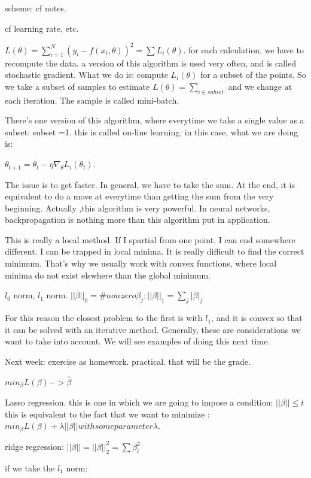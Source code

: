 \documentclass[a4paper]{tufte-book}
\begin{document}
scheme: cf notes.

cf learning rate, etc.

$L(\theta) = \sum_{i=1}^N (y_i - f(x_i,\theta))^2
= \sum L_i(\theta)$.
for each calculation, we have to recompute the data.
a version of this algorithm is used very often, and is called stochastic gradient.
What we do is: compute $L_i(\theta)$ for a subset of the points.
So we take a subset of samples to estimate $L(\theta) = \sum_{i\in subset}$ and we
change at each iteration.
The sample is called mini-batch.

There's one version of this algorithm, where everytime we take a single value as
a subset: subset =1. this is called on-line learning. in this case, what we are
doing is:

$\theta_{t+1} = \theta_{t} - \eta \nabla_\theta L_i(\theta_{t})$.

The issue is to get faster. In general, we have to take the sum.
At the end, it is equivalent to do a move at everytime than getting the sum from
the very beginning.
Actually ,this algorithm is very powerful. In neural networks, backpropagation
is nothing more than this algorithm put in application.

This is really a local method. If I spartial from one point, I can end somewhere
different. I can be trapped in local minima. It is really difficult to find the 
correct minimum. That's why we usually work with convex functions, where local
minima do not exist elswhere than the global minimum.

$l_0$ norm, $l_1$ norm.
$||\beta||_0 = \# nonzero \beta_j ; ||\beta||_1 = \sum_j |\beta|_j$

For this reason the closest problem to the first is with $l_1$, and it is convex
so that it can be solved with an iterative method. Generally, these are
considerations we want to take into account.
We will see examples of doing this next time.

Next week: exercise as homework. practical.
that will be the grade.

$min_\beta L(\beta) -> \hat \beta$

Lasso regression.
this is one in which we are going to impose a condition:
$||\beta|| \leq t$
this is equivalent to the fact that we want to minimize :
$min_\beta L(\beta) + \lambda ||\beta|| with some parameter \lambda.$

ridge regression: $||\beta|| = ||\beta||_2^2
= \sum \beta_i^2$

if we take the $l_1$ norm:
\end{document}
